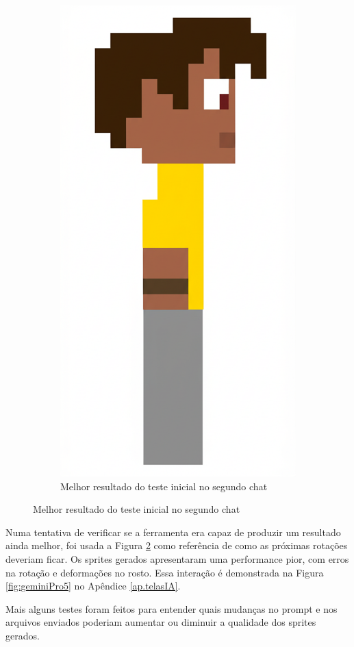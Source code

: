 \begin{figure}[htbp]
\begin{subfigure}{0.45 \linewidth}
        \centering
        \includegraphics[width=0.7\linewidth]{figs/geminiPro/chat2/res1_tela1.png}
        \caption{\small Melhor resultado do teste inicial no segundo chat}
        \label{fig:geminiProSideCompararMelhor2}
    \end{subfigure}
\end{figure}

Numa tentativa de verificar se a ferramenta era capaz de produzir um resultado ainda melhor, foi usada a Figura \ref{fig:geminiProSideCompararMelhor2} como referência de como as próximas rotações deveriam ficar. Os sprites gerados apresentaram uma performance pior, com erros na rotação e deformações no rosto. Essa interação é demonstrada na Figura \ref{fig:geminiPro5} no Apêndice \ref{ap.telasIA}.

Mais alguns testes foram feitos para entender quais mudanças no prompt e nos arquivos enviados poderiam aumentar ou diminuir a qualidade dos sprites gerados. 

